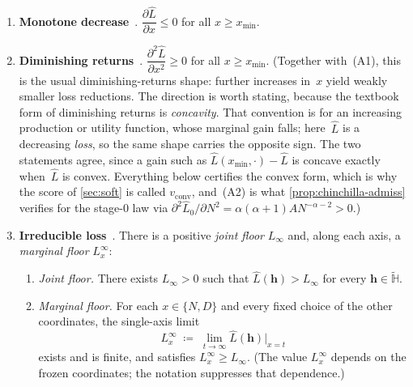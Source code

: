 \documentclass[11pt]{article}
\newcommand{\bbH}{\mathbb{H}}
\newcommand{\Lhat}{\hat{L}}
\theoremstyle{plain}
\theoremstyle{remark}
\begin{document}
\begin{enumerate}[nosep, leftmargin=2.2em, label=\textup{(A\arabic*)}]
    \item \textbf{Monotone decrease}~\citep{hestness2017scaling,kaplan2020scaling}.
    $\dfrac{\partial \Lhat}{\partial x} \leq 0$ for all $x \geq x_{\min}$.
    \item \textbf{Diminishing returns}~\citep{hestness2017scaling,kaplan2020scaling}.
    $\dfrac{\partial^2 \Lhat}{\partial x^2} \geq 0$ for all $x \geq x_{\min}$.
    (Together with~(A1), this is the usual diminishing-returns shape: further
    increases in~$x$ yield weakly smaller loss reductions.
    The direction is worth stating, because the textbook form of diminishing
    returns is \emph{concavity}. That convention is for an increasing
    production or utility function, whose marginal gain falls; here~$\Lhat$ is
    a decreasing \emph{loss}, so the same shape carries the opposite sign. The
    two statements agree, since a gain such as $\Lhat(x_{\min},\cdot)-\Lhat$ is
    concave exactly when~$\Lhat$ is convex. Everything below certifies the
    convex form, which is why the score of \cref{sec:soft} is called
    $v_{\mathrm{conv}}$, and~(A2) is what
    \cref{prop:chinchilla-admiss} verifies for the stage-0 law via
    $\partial^2\Lhat_0/\partial N^2=\alpha(\alpha+1)A N^{-\alpha-2}>0$.)
    \item \textbf{Irreducible loss}~\citep{hestness2017scaling,hoffmann2022chinchilla}.
    There is a positive \emph{joint floor} $L_\infty$ and, along each axis, a
    \emph{marginal floor} $L^{\infty}_{x}$:
    \begin{enumerate}[nosep, leftmargin=1.4em, label=\textup{(\roman*)}]
        \item \emph{Joint floor.}
        There exists $L_\infty > 0$ such that
        $\Lhat(\mathbf{h}) > L_\infty$ for every $\mathbf{h} \in \widetilde{\bbH}$.
        \item \emph{Marginal floor.}
        For each $x \in \{N,D\}$ and every fixed choice of the other
        coordinates, the single-axis limit
        \begin{equation}\label{eq:margfloor-bb}
            L^{\infty}_{x}
            \;\coloneqq\;
            \lim_{t \to \infty}
            \Lhat(\mathbf{h})\big|_{x = t}
        \end{equation}
        exists and is finite, and satisfies
        $L^{\infty}_{x} \geq L_\infty$.
        (The value $L^{\infty}_{x}$ depends on the frozen coordinates; the notation
        suppresses that dependence.)

\end{enumerate}
\end{enumerate}
\end{document}
